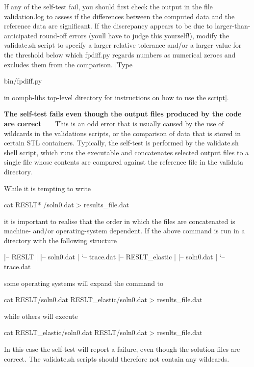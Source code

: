If any of the self-\/test fail, you should first check the output in the file {\ttfamily validation.\+log} to assess if the differences between the computed data and the reference data are significant. If the discrepancy appears to be due to larger-\/than-\/anticipated round-\/off errors (you\textquotesingle{}ll have to judge this yourself!), modify the {\ttfamily validate.\+sh} script to specify a larger relative tolerance and/or a larger value for the threshold below which {\ttfamily fpdiff.\+py} regards numbers as numerical zeroes and excludes them from the comparison. \mbox{[}Type 
\begin{DoxyCode}
bin/fpdiff.py 
\end{DoxyCode}
 in {\ttfamily oomph-\/lib\textquotesingle{}s} top-\/level directory for instructions on how to use the script\mbox{]}.

{\bfseries The self-\/test fails even though the output files produced by the code are correct} ~\newline
~\newline
 This is an odd error that is usually caused by the use of wildcards in the validations scripts, or the comparison of data that is stored in certain S\+TL containers. Typically, the self-\/test is performed by the {\ttfamily validate.\+sh} shell script, which runs the executable and concatenates selected output files to a single file whose contents are compared against the reference file in the {\ttfamily validata} directory.

While it is tempting to write 
\begin{DoxyCode}
cat RESLT* /soln0.dat > results\_file.dat
\end{DoxyCode}
 it is important to realise that the order in which the files are concatenated is machine-\/ and/or operating-\/system dependent. If the above command is run in a directory with the following structure 
\begin{DoxyCode}
|-- RESLT
|   |-- soln0.dat
|   `-- trace.dat
|-- RESLT\_elastic
|   |-- soln0.dat
|   `-- trace.dat
\end{DoxyCode}
 some operating systems will expand the command to 
\begin{DoxyCode}
cat RESLT/soln0.dat RESLT\_elastic/soln0.dat > results\_file.dat
\end{DoxyCode}
 while others will execute 
\begin{DoxyCode}
cat RESLT\_elastic/soln0.dat RESLT/soln0.dat > results\_file.dat
\end{DoxyCode}
 In this case the self-\/test will report a failure, even though the solution files are correct. The {\ttfamily validate.\+sh} scripts should therefore not contain any wildcards.

